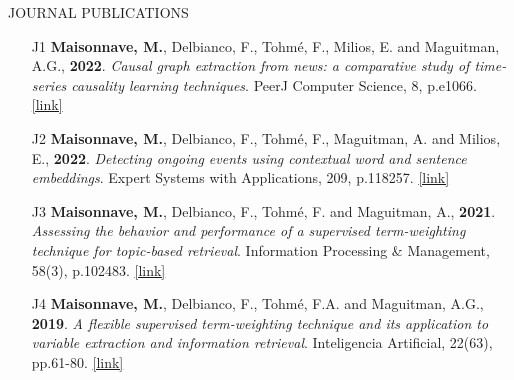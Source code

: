 \documentclass{resume} %
\begin{document}
\begin{rSection}{JOURNAL PUBLICATIONS}
\smallskip
\begin{itemize}
    

\item[J1] \textbf{Maisonnave, M.}, Delbianco, F., Tohmé, F., Milios, E. and Maguitman, A.G., \textbf{2022}. \textit{Causal graph extraction from news: a comparative study of time-series causality learning techniques}. PeerJ Computer Science, 8, p.e1066. 
\href{https://peerj.com/articles/cs-1066/}{[link]}

\item[J2] \textbf{Maisonnave, M.}, Delbianco, F., Tohmé, F., Maguitman, A. and Milios, E., \textbf{2022}. \textit{Detecting ongoing events using contextual word and sentence embeddings}. Expert Systems with Applications, 209, p.118257. 
\href{https://www.sciencedirect.com/science/article/pii/S0957417422013975}{[link]}

\item[J3] \textbf{Maisonnave, M.}, Delbianco, F., Tohmé, F. and Maguitman, A., \textbf{2021}. \textit{Assessing the behavior and performance of a supervised term-weighting technique for topic-based retrieval}. Information Processing \& Management, 58(3), p.102483. 
\href{https://www.sciencedirect.com/science/article/pii/S0306457320309729}{[link]}

\item[J4] \textbf{Maisonnave, M.}, Delbianco, F., Tohmé, F.A. and Maguitman, A.G., \textbf{2019}. \textit{A flexible supervised term-weighting technique and its application to variable extraction and information retrieval}. Inteligencia Artificial, 22(63), pp.61-80. 
\href{http://journal.iberamia.org/index.php/intartif/article/view/255}{[link]}
\end{itemize}
\end{rSection} 
\end{document}

